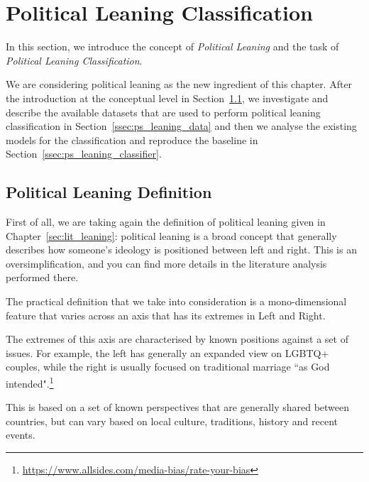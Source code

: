 \section{\statusgreen Political Leaning Classification}
\label{sec:ps_political_sides}

In this section, we introduce the concept of \emph{Political Leaning} and the task of \emph{Political Leaning Classification}.

We are considering political leaning as the new ingredient of this chapter. After the introduction at the conceptual level in Section~\ref{ssec:ps_leaning_def}, we investigate and describe the available datasets that are used to perform political leaning classification in Section~\ref{ssec:ps_leaning_data} and then we analyse the existing models for the classification and reproduce the baseline in Section~\ref{ssec:ps_leaning_classifier}.


\subsection{\statusgreen Political Leaning Definition}
\label{ssec:ps_leaning_def}

First of all, we are taking again the definition of political leaning given in Chapter~\ref{sec:lit_leaning}: political leaning is a broad concept that generally describes how someone's ideology is positioned between left and right. This is an oversimplification, and you can find more details in the literature analysis performed there.

The practical definition that we take into consideration is a mono-dimensional feature that varies across an axis that has its extremes in Left and Right.

The extremes of this axis are characterised by known positions against a set of issues. For example, the left has generally an expanded view on LGBTQ+ couples, while the right is usually focused on traditional marriage ``as God intended".\footnote{\url{https://www.allsides.com/media-bias/rate-your-bias}}


This is based on a set of known perspectives that are generally shared between countries, but can vary based on local culture, traditions, history and recent events.

